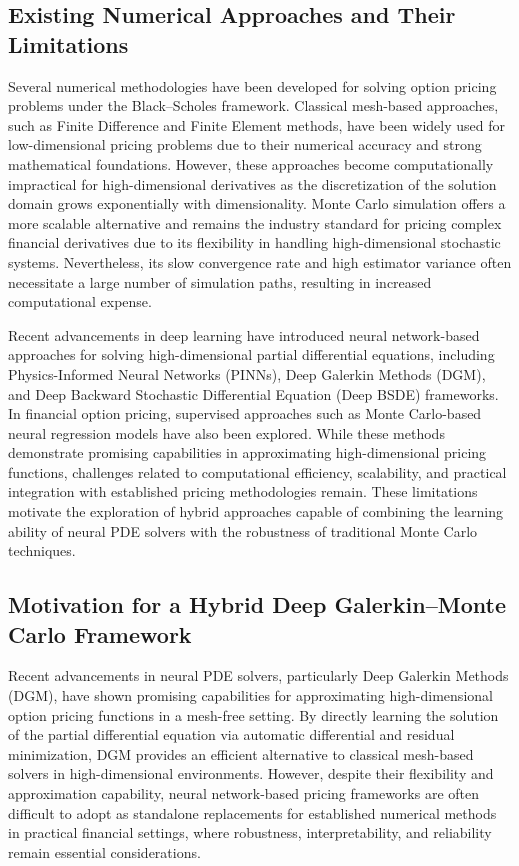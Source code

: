 \documentclass[12pt, a4paper]{article}
\begin{document}
\subsection{Existing Numerical Approaches and Their Limitations}

Several numerical methodologies have been developed for solving option
pricing problems under the Black--Scholes framework. Classical
mesh-based approaches, such as Finite Difference and Finite Element
methods, have been widely used for low-dimensional pricing problems
due to their numerical accuracy and strong mathematical foundations.
However, these approaches become computationally impractical for
high-dimensional derivatives as the discretization of the solution
domain grows exponentially with dimensionality. Monte Carlo simulation
offers a more scalable alternative and remains the industry standard
for pricing complex financial derivatives due to its flexibility in
handling high-dimensional stochastic systems. Nevertheless, its slow
convergence rate and high estimator variance often necessitate a large
number of simulation paths, resulting in increased computational
expense.

Recent advancements in deep learning have introduced neural
network-based approaches for solving high-dimensional partial
differential equations, including Physics-Informed Neural Networks
(PINNs), Deep Galerkin Methods (DGM), and Deep Backward Stochastic
Differential Equation (Deep BSDE) frameworks. In financial option
pricing, supervised approaches such as Monte Carlo-based neural
regression models have also been explored. While these methods
demonstrate promising capabilities in approximating high-dimensional
pricing functions, challenges related to computational efficiency,
scalability, and practical integration with established pricing
methodologies remain. These limitations motivate the exploration of
hybrid approaches capable of combining the learning ability of neural
PDE solvers with the robustness of traditional Monte Carlo techniques.

\subsection{Motivation for a Hybrid Deep Galerkin--Monte Carlo Framework}

Recent advancements in neural PDE solvers, particularly Deep Galerkin
Methods (DGM), have shown promising capabilities for approximating
high-dimensional option pricing functions in a mesh-free setting. By
directly learning the solution of the partial differential equation
via automatic differential and residual minimization, DGM provides an
efficient alternative to classical mesh-based solvers in
high-dimensional environments. However, despite their flexibility and
approximation capability, neural network-based pricing frameworks are
often difficult to adopt as standalone replacements for established
numerical methods in practical financial settings, where robustness,
interpretability, and reliability remain essential considerations.
\end{document}
